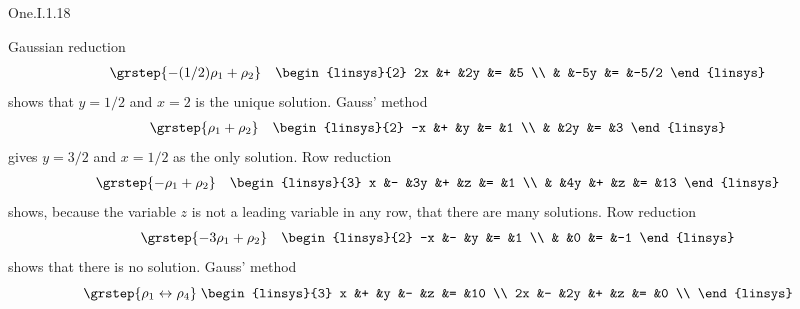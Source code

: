 \begin{ans}{One.I.1.18}
      \begin{exparts}
       \partsitem Gaussian reduction
        \begin{eqnarray*}
          &\grstep{-(1/2)\rho_1+\rho_2}
          &\begin{linsys}{2}
             2x  &+  &2y  &=  &5  \\
                 &   &-5y &=  &-5/2
          \end{linsys}
        \end{eqnarray*}
        shows that \( y=1/2 \) and \( x=2 \) is the unique solution.
      \partsitem Gauss' method
        \begin{eqnarray*}
          &\grstep{\rho_1+\rho_2}
          &\begin{linsys}{2}
             -x  &+  &y   &=  &1  \\
                 &   &2y  &=  &3
           \end{linsys}
        \end{eqnarray*}
        gives \( y=3/2 \) and \( x=1/2 \) as the only solution.
      \partsitem Row reduction
        \begin{eqnarray*}
            &\grstep{-\rho_1+\rho_2}
            &\begin{linsys}{3}
                x  &-  &3y  &+  &z  &=  &1  \\
                   &   &4y  &+  &z  &=  &13
             \end{linsys}
        \end{eqnarray*}
        shows, because the variable $z$ is not a leading variable in any
        row, that there are many solutions.
      \partsitem Row reduction
        \begin{eqnarray*}
          &\grstep{-3\rho_1+\rho_2}
          &\begin{linsys}{2}
             -x  &-  &y   &=  &1  \\
                 &   &0   &=  &-1
           \end{linsys}
        \end{eqnarray*}
        shows that there is no solution.
      \partsitem Gauss' method
        \begin{equation*}
            \grstep{\rho_1\leftrightarrow\rho_4}\;
            \begin{linsys}{3}
                x  &+  &y   &-  &z  &=  &10 \\
               2x  &-  &2y  &+  &z  &=  &0  \\

\end{linsys}
\end{equation*}
\end{exparts}
\end{ans}
